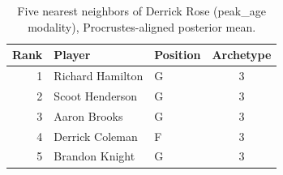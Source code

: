 \begin{table}[htbp]
  \centering\small
  \begin{tabular}{rllc}
    \toprule
    Rank & Player & Position & Archetype \\
    \midrule
    1 & Richard Hamilton & G & 3 \\
    2 & Scoot Henderson & G & 3 \\
    3 & Aaron Brooks & G & 3 \\
    4 & Derrick Coleman & F & 3 \\
    5 & Brandon Knight & G & 3 \\
    \bottomrule
  \end{tabular}
  \caption{Five nearest neighbors of Derrick Rose (peak_age modality), Procrustes-aligned posterior mean.}
  \label{tab:Derrick_Rose_neighbors_peak_age}
\end{table}

